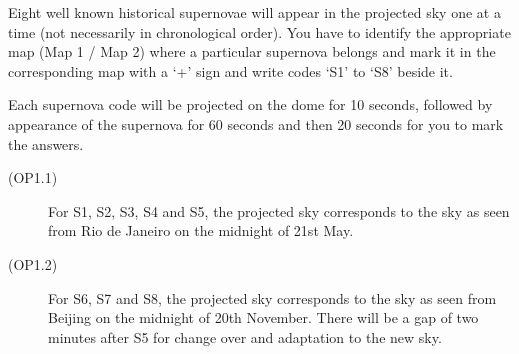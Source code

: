Eight well known historical supernovae will appear in the projected sky one
at a time (not necessarily in chronological order). You have to identify the
appropriate map (Map 1 / Map 2) where a particular supernova belongs and
mark it in the corresponding map with a `+' sign and write codes `S1' to
`S8' beside it.

Each supernova code will be projected on the dome for 10 seconds, followed
by appearance of the supernova for 60 seconds and then 20 seconds for you to
mark the answers.

\begin{description}
\item[(OP1.1)] For S1, S2, S3, S4 and S5, the projected sky corresponds to
  the sky as seen from Rio de Janeiro on the midnight of 21st May.
\item[(OP1.2)] For S6, S7 and S8, the projected sky corresponds to the sky
  as seen from Beijing on the midnight of 20th November. There will be a gap
  of two minutes after S5 for change over and adaptation to the new sky.
\end{description}

